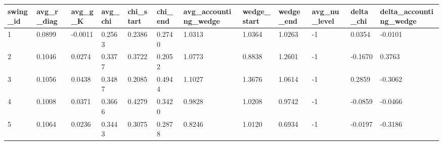 \begin{tabular}{llllllllllll}
\hline
swing\_id & avg\_r\_diag & avg\_g\_K & avg\_chi & chi\_start & chi\_end & avg\_accounting\_wedge & wedge\_start & wedge\_end & avg\_nu\_level & delta\_chi & delta\_accounting\_wedge \\
\hline
1 & 0.0899 & -0.0011 & 0.2563 & 0.2386 & 0.2740 & 1.0313 & 1.0364 & 1.0263 & -1 & 0.0354 & -0.0101 \\
2 & 0.1046 & 0.0274 & 0.3377 & 0.3722 & 0.2052 & 1.0773 & 0.8838 & 1.2601 & -1 & -0.1670 & 0.3763 \\
3 & 0.1056 & 0.0438 & 0.3487 & 0.2085 & 0.4944 & 1.1027 & 1.3676 & 1.0614 & -1 & 0.2859 & -0.3062 \\
4 & 0.1008 & 0.0371 & 0.3666 & 0.4279 & 0.3420 & 0.9828 & 1.0208 & 0.9742 & -1 & -0.0859 & -0.0466 \\
5 & 0.1064 & 0.0236 & 0.3443 & 0.3075 & 0.2878 & 0.8246 & 1.0120 & 0.6934 & -1 & -0.0197 & -0.3186 \\
\hline
\end{tabular}
